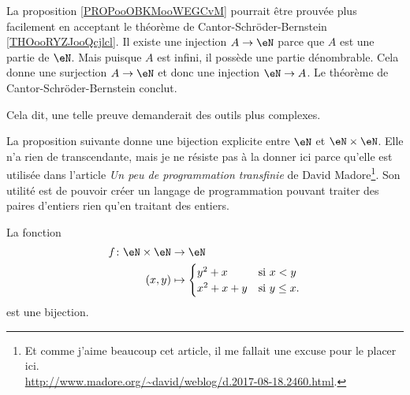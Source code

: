 \begin{normaltext}
	La proposition \ref{PROPooOBKMooWEGCvM} pourrait être prouvée plus facilement en acceptant le théorème de Cantor-Schröder-Bernstein \ref{THOooRYZJooQcjlcl}. Il existe une injection \( A\to \eN\) parce que \( A\) est une partie de \( \eN\). Mais puisque \( A\) est infini, il possède une partie dénombrable. Cela donne une surjection \( A\to \eN\) et donc une injection \( \eN\to A\). Le théorème de Cantor-Schröder-Bernstein conclut.

	Cela dit, une telle preuve demanderait des outils plus complexes.
\end{normaltext}


\begin{normaltext}
	La proposition suivante donne une bijection explicite entre \( \eN\) et \( \eN\times \eN\). Elle n'a rien de transcendante, mais je ne résiste pas à la donner ici parce qu'elle est utilisée dans l'article \emph{Un peu de programmation transfinie} de David Madore\footnote{Et comme j'aime beaucoup cet article, il me fallait une excuse pour le placer ici.\\ \url{http://www.madore.org/~david/weblog/d.2017-08-18.2460.html}.}. Son utilité est de pouvoir créer un langage de programmation pouvant traiter des paires d'entiers rien qu'en traitant des entiers.
\end{normaltext}
\begin{proposition}        \label{PROPooLPKUooAlsYJg}
	La fonction
	\begin{equation}
		\begin{aligned}
			f\colon \eN\times \eN & \to \eN                               \\
			(x,y)                 & \mapsto \begin{cases}
				                                y^2+x   & \text{si } x<y      \\
				                                x^2+x+y & \text{si } y\leq x.
			                                \end{cases}
		\end{aligned}
	\end{equation}
	est une bijection.
\end{proposition}


